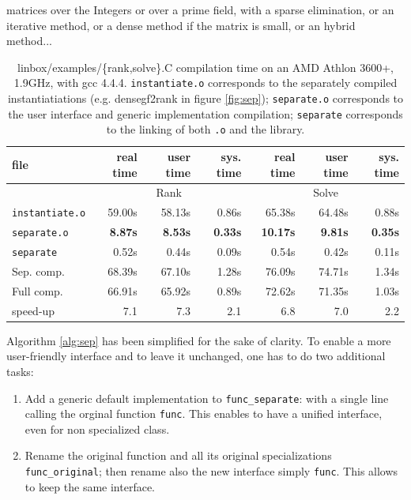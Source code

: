 \documentclass[runningheads,a4paper]{llncs}
\begin{document}
matrices over the Integers or over a prime field, with a sparse
elimination, or an iterative method, or a dense method if the matrix
is small, or an hybrid method...\\ 
\begin{table}[ht]\center
\begin{tabular}{|l||r|r|r||r|r|r|}
\hline
file                      &  real time   &  user time   &  sys. time  &  real time   &  user time   &  sys. time \\
\hline
 & \multicolumn{3}{|c||}{Rank}& \multicolumn{3}{|c|}{Solve}\\
\hline
 \texttt{instantiate.o}    &   59.00s   &   58.13s   &   0.86s  &   65.38s   &   64.48s   &   0.88s \\
 \texttt{separate.o}      &\bf    8.87s   & \bf    8.53s   & \bf   0.33s  & \bf   10.17s   &  \bf   9.81s   & \bf   0.35s \\
 \texttt{separate}         &    0.52s   &    0.44s   &   0.09s  &    0.54s   &    0.42s   &   0.11s \\
\hline
 Sep. comp.       &   68.39s   &   67.10s   &   1.28s  &   76.09s   &   74.71s   &   1.34s \\
\hline
\hline
 Full comp.       &   66.91s   &   65.92s   &   0.89s  &   72.62s   &   71.35s   &   1.03s \\
\hline
\hline
 speed-up         &   7.1   &   7.3   &   2.1   &   6.8   &   7.0   &   2.2  \\
\hline
\end{tabular} 
\caption{linbox/examples/\{rank,solve\}.C compilation time on an AMD
  Athlon 3600+, 1.9GHz, with gcc 4.4.4. \texttt{instantiate.o} corresponds to the separately compiled
  instantiatiations (e.g. densegf2rank in figure \ref{fig:sep});
  \texttt{separate.o} corresponds to the user interface and generic
  implementation compilation; \texttt{separate} corresponds to the
  linking of both \texttt{.o} and the library.}\label{tab:compilation}
\end{table}

\begin{remark} Algorithm \ref{alg:sep} has been simplified for the
  sake of clarity. To enable a more user-friendly interface and to
  leave it unchanged, one has to do two additional tasks:
\begin{enumerate}
\item Add a generic default implementation to \texttt{func\_separate}:
 with a single line calling the orginal function \texttt{func}. This
 enables to have a unified interface, even for non specialized class.
\item Rename the original function and all its
  original specializations \texttt{func\_original}; then rename also
  the new interface simply \texttt{func}. This allows to keep the same
  interface.
\end{enumerate}
\end{remark}
\end{document}
